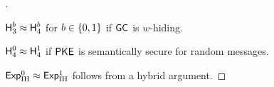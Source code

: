 \begin{proof}[]
\begin{claim}\label{clm:index-hiding-hyb34}
${\Hyb_3^b\approx\Hyb_4^b}$ for ${b\in{\{0,1\}}}$
if $\GC$ is $w$-hiding.
\end{claim}

\begin{claim}\label{clm:index-hiding-hyb4}
${\Hyb_4^0\approx\Hyb_4^1}$
if $\PKE$ is semantically secure for random messages.
\end{claim}

\noindent
${\ExpIH{0}\approx\ExpIH{1}}$ follows from a hybrid argument.
\end{proof}
